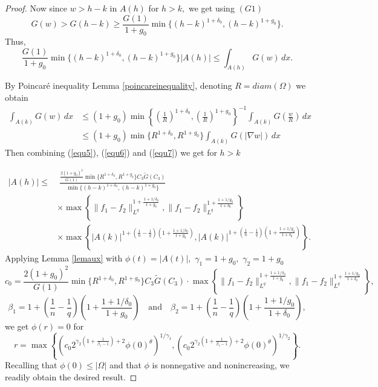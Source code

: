 \documentclass[11pt, leqno]{article}
\theoremstyle{definition}
\theoremstyle{remark}
\numberwithin{equation}{section}
\begin{document}
\begin{proof}
Now since $w>h-k$ in $A(h)$ for $h>k,$ we get using $(G1)$
$$G(w)>G(h-k)\geq \frac{G(1)}{1+g_0}\min\{(h-k)^{1+\delta_0}, (h-k)^{1+g_0}\}. $$
Thus,
\begin{equation}\label{equ6}
   \frac{G(1)}{1+g_0}\min\{(h-k)^{1+\delta_0}, (h-k)^{1+g_0}\}|A(h)| \leq \int_{A(h)}G(w)\,dx. 
\end{equation}


By Poincaré inequality Lemma \ref{poincareinequality}, denoting $R=diam(\Omega)$ we obtain
\begin{equation}\label{equ7}
\begin{aligned}
 \int_{A(k)}G(w)\,dx &\leq (1+g_0)\min\left \{ \left(\frac{1}{R}\right)^{1+\delta_0}, \left(\frac{1}{R}\right)^{1+g_0}  \right \}^{-1}\int_{A(k)}G\left(\frac{w}{R}\right)\,dx\\
 &\leq (1+g_0)\min\{R^{1+\delta_0}, R^{1+g_0}\}\int_{A(k)}G(|\nabla w|)\,dx
\end{aligned}
\end{equation}
Then combining (\ref{equ5}), (\ref{equ6}) and (\ref{equ7}) we get for $h>k$

\begin{equation}\label{eq:estimate}
\begin{aligned}
|A(h)| \leq &\; \frac{\frac{2(1+g_0)^2}{G(1)}\min\{R^{1+\delta_0}, R^{1+g_0}\} C_3\tilde{G}(C_3)}{\min\{(h-k)^{1+\delta_0}, (h-k)^{1+g_0}\}} \\
&\times \max\left\{ 
\|f_1-f_2\|_{L^q}^{1+ \frac{1+1/\delta_0}{1+g_0}}, 
\|f_1-f_2\|_{L^q}^{1+ \frac{1+1/g_0}{1+\delta_0}}
\right\} \\
&\times \max\left\{ |A(k)|^{1+\left(\frac{1}{n}-\frac{1}{q}\right)\left(1+\frac{1+1/\delta_0}{1+g_0} \right)}, |A(k)|^{1+\left(\frac{1}{n}-\frac{1}{q}\right)\left(1+\frac{1+1/g_0}{1+\delta_0} \right)} \right\}.
\end{aligned}
\end{equation}
Applying Lemma \ref{lemaux} with $\phi(t)=|A(t)|,\,\, \gamma_1=1+g_0,\,\,\gamma_2=1+g_0$
$$c_0= \frac{2(1+g_0)^2}{G(1)}\min\{R^{1+\delta_0}, R^{1+g_0}\} C_3\tilde{G}(C_3)\cdot \max\left\{ 
\|f_1-f_2\|_{L^q}^{1+ \frac{1+1/\delta_0}{1+g_0}}, 
\|f_1-f_2\|_{L^q}^{1+ \frac{1+1/g_0}{1+\delta_0}}
\right\}, $$
$$\beta_1= 1+ \left(\frac{1}{n}-\frac{1}{q}\right)\left(1+\frac{1+1/\delta_0}{1+g_0} \right)\quad\text{and}\quad \beta_2= 1+ \left(\frac{1}{n}-\frac{1}{q}\right)\left(1+\frac{1+1/g_0}{1+\delta_0} \right),  $$
 we get $\phi(r)=0$ for
$$
 r=\max\left\{ \left(c_0 2^{\gamma_2(1+\frac{1}{\beta_1-1})+2}\phi(0)^\theta\right)^{1/\gamma_1}, \left(c_0 2^{\gamma_2(1+\frac{1}{\beta_1-1})+2}\phi(0)^\theta\right)^{1/\gamma_2} \right\}.
$$
Recalling that \(\phi(0)\leq |\Omega|\) and that \(\phi\) is nonnegative and nonincreasing, we readily obtain the desired result.
\end{proof}
\end{document}
